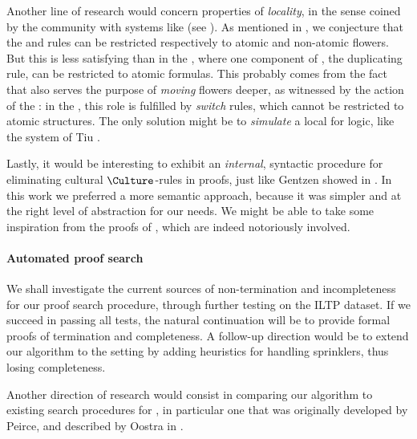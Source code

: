 \begin{scope}
Another line of research would concern properties of \emph{locality}, in the
sense coined by the  community with systems like  (see
). As mentioned in , we
conjecture that the  and  rules can be restricted
respectively to atomic and non-atomic flowers. But this is less satisfying than
in the , where one component of , the
duplicating \emph{} rule, can be restricted to atomic formulas. This
probably comes from the fact that  also serves the purpose of
\emph{moving} flowers deeper, as witnessed by the   action of
the : in the , this role is fulfilled by
\emph{switch} rules, which cannot be restricted to atomic structures. The only
solution might be to \emph{simulate} a local  for
 logic, like the system  of Tiu
.

Lastly, it would be interesting to exhibit an \emph{internal}, syntactic
procedure for eliminating cultural $\Culture$-rules in proofs, just like Gentzen
showed  in . In this work we preferred a more
semantic approach, because it was simpler and at the right level of abstraction
for our needs. We might be able to take some inspiration from the
 proofs of , which are indeed notoriously
involved.

\paragraph{Automated proof search}

We shall investigate the current sources of non-termination and incompleteness
for our  proof search procedure, through further testing on the
ILTP dataset. If we succeed in passing all tests, the natural continuation will
be to provide formal proofs of termination and completeness. A follow-up
direction would be to extend our algorithm to the  setting by adding
heuristics for handling sprinklers, thus losing completeness.

Another direction of research would consist in comparing our algorithm to
existing search procedures for , in particular one that was originally
developed by Peirce, and described by Oostra in .


\end{scope}
